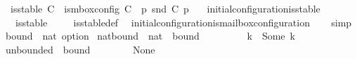 \begin{isabellebody}
\ \ {\isachardoublequoteopen}is{\isacharunderscore}{\kern0pt}stable\ C\ {\isasymequiv}\ is{\isacharunderscore}{\kern0pt}mbox{\isacharunderscore}{\kern0pt}config\ C\ {\isasymand}\ {\isacharparenleft}{\kern0pt}{\isasymforall}p{\isachardot}{\kern0pt}\ snd\ {\isacharparenleft}{\kern0pt}C\ p{\isacharparenright}{\kern0pt}\ {\isacharequal}{\kern0pt}\ {\isasymepsilon}{\isacharparenright}{\kern0pt}{\isachardoublequoteclose}\isanewline
\isanewline
{}\isamarkupfalse%
\ initial{\isacharunderscore}{\kern0pt}configuration{\isacharunderscore}{\kern0pt}is{\isacharunderscore}{\kern0pt}stable{\isacharcolon}{\kern0pt}\isanewline
\ \ \ {\isachardoublequoteopen}is{\isacharunderscore}{\kern0pt}stable\ {\isasymC}\isactrlsub {\isasymI}\isactrlsub {\isasymmm}{\isachardoublequoteclose}\isanewline
%
\isadelimproof
\ \ %
\endisadelimproof
%
\isatagproof
{}\isamarkupfalse%
\ is{\isacharunderscore}{\kern0pt}stable{\isacharunderscore}{\kern0pt}def\ \isamarkupfalse%
\ initial{\isacharunderscore}{\kern0pt}configuration{\isacharunderscore}{\kern0pt}is{\isacharunderscore}{\kern0pt}mailbox{\isacharunderscore}{\kern0pt}configuration\isanewline
\ \ \isamarkupfalse%
\ simp%
\endisatagproof
{\isafoldproof}%
%
\isadelimproof
\isanewline
%
\endisadelimproof
\isanewline
{}\isamarkupfalse%
\ bound\ {\isacharequal}{\kern0pt}\ {\isachardoublequoteopen}nat\ option{\isachardoublequoteclose}\isanewline
\isanewline
{}\isamarkupfalse%
\ nat{\isacharunderscore}{\kern0pt}bound\ {\isacharcolon}{\kern0pt}{\isacharcolon}{\kern0pt}\ {\isachardoublequoteopen}nat\ {\isasymRightarrow}\ bound{\isachardoublequoteclose}\ \ {\isacharparenleft}{\kern0pt}{\isachardoublequoteopen}{\isasymB}\ {\isacharunderscore}{\kern0pt}{\isachardoublequoteclose}\ {\isacharbrackleft}{\kern0pt}{}{}{\isacharbrackright}{\kern0pt}\ {}{}{}{\isacharparenright}{\kern0pt}\ \isanewline
\ \ {\isachardoublequoteopen}{\isasymB}\ k\ {\isasymequiv}\ Some\ k{\isachardoublequoteclose}\isanewline
\isanewline
{}\isamarkupfalse%
\ unbounded\ {\isacharcolon}{\kern0pt}{\isacharcolon}{\kern0pt}\ {\isachardoublequoteopen}bound{\isachardoublequoteclose}\ \ {\isacharparenleft}{\kern0pt}{\isachardoublequoteopen}{\isasyminfinity}{\isachardoublequoteclose}\ {}{}{}{\isacharparenright}{\kern0pt}\ \isanewline
\ \ {\isachardoublequoteopen}{\isasyminfinity}\ {\isasymequiv}\ None{\isachardoublequoteclose}\isanewline

\end{isabellebody}
